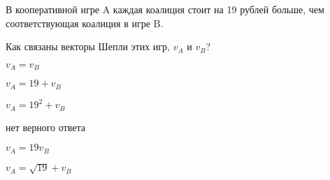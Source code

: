 
\begin{question}
В кооперативной игре A каждая коалиция стоит на 19 рублей больше,
чем соответствующая коалиция в игре B.

Как связаны векторы Шепли этих игр, \(v_A\) и \(v_B\)?
\begin{answerlist}
  \item \(v_A = v_B\)
  \item \(v_A = 19 + v_B\)
  \item \(v_A = 19^2 + v_B\)
  \item нет верного ответа
  \item \(v_A = 19 v_B\)
  \item \(v_A = \sqrt{19} + v_B\)
\end{answerlist}
\end{question}


